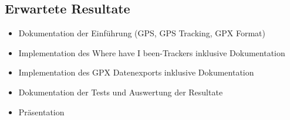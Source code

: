 \subsection{Erwartete Resultate}
\begin{itemize}
\item Dokumentation der Einführung (GPS, GPS Tracking, GPX Format)
\item Implementation des \flqq Where have I been\frqq-Trackers inklusive Dokumentation
\item Implementation des GPX Datenexports inklusive Dokumentation
\item Dokumentation der Tests und Auswertung der Resultate
\item Präsentation
\end{itemize}
